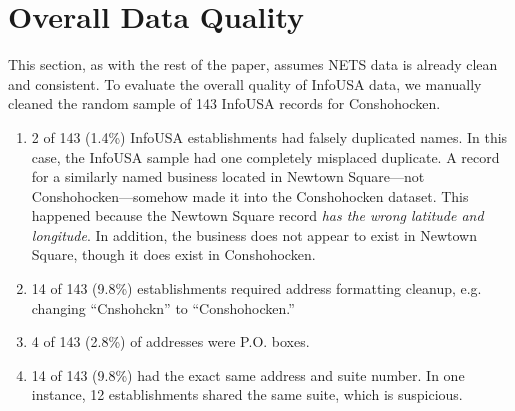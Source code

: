 \documentclass[paper = letter, fontsize = 11pt]{scrartcl}
\begin{document}
\section{Overall Data Quality}
This section, as with the rest of the paper, assumes NETS data is already clean and consistent. To evaluate the overall quality of InfoUSA data, we manually cleaned the random sample of 143 InfoUSA records for Conshohocken.
\begin{enumerate}
	\item 2 of 143 (1.4\%) InfoUSA establishments had falsely duplicated names. In this case, the InfoUSA sample had one completely misplaced duplicate. A record for a similarly named business located in Newtown Square---not Conshohocken---somehow made it into the Conshohocken dataset. This happened because the Newtown Square record \textit{has the wrong latitude and longitude}. In addition, the business does not appear to exist in Newtown Square, though it does exist in Conshohocken.
	\item 14 of 143 (9.8\%) establishments required address formatting cleanup, e.g. changing ``Cnshohckn'' to ``Conshohocken.''
	\item 4 of 143 (2.8\%) of addresses were P.O. boxes.
	\item 14 of 143 (9.8\%) had the exact same address and suite number. In one instance, 12 establishments shared the same suite, which is suspicious.
\end{enumerate}
\clearpage
\end{document}
